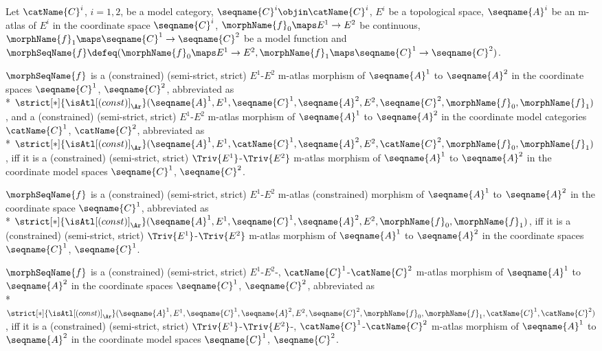 \documentclass{article}
\begin{document}
\begin{definition}
Let $\catName{C}^i$, $i=1,2$, be a model category,
$\seqname{C}^i \objin \catName{C}^i$, $E^i$ be a topological space,
$\seqname{A}^i$ be an m-atlas of $E^i$ in the coordinate space
$\seqname{C}^i$, $\morphName{f}_0 \maps E^1 \to E^2$ be continuous,
$\morphName{f}_1 \maps \seqname{C}^1 \to \seqname{C}^2$ be a model
function and
$
  \morphSeqName{f} \defeq
  (
    \morphName{f}_0 \maps E^1 \to E^2,
    \morphName{f}_1 \maps \seqname{C}^1 \to \seqname{C}^2
  )
$.

$\morphSeqName{f}$ is a (constrained) (semi-strict, strict) $E^1$-$E^2$
m-atlas morphism of $\seqname{A}^1$ to $\seqname{A}^2$ in the
coordinate spaces $\seqname{C}^1$, $\seqname{C}^2$, abbreviated as \\*
$
  \strict[*]{\isAtl[(const)]_\Ar}
    (
      \seqname{A}^1,
      E^1,
      \seqname{C}^1,
      \seqname{A}^2,
      E^2,
      \seqname{C}^2,
      \morphName{f}_0,
      \morphName{f}_1
    )
$,
and a (constrained) (semi-strict, strict) $E^1$-$E^2$ m-atlas
morphism of $\seqname{A}^1$ to $\seqname{A}^2$ in the coordinate model
categories $\catName{C}^1$, $\catName{C}^2$, abbreviated as \\*
$
  \strict[*]{\isAtl[(const)]_\Ar}
    (
      \seqname{A}^1,
      E^1,
      \catName{C}^1,
      \seqname{A}^2,
      E^2,
      \catName{C}^2,
      \morphName{f}_0,
      \morphName{f}_1
    )
$,
iff it is a (constrained) (semi-strict, strict)
$\Triv{E^1}$-$\Triv{E^2}$ m-atlas morphism of $\seqname{A}^1$ to
$\seqname{A}^2$ in the coordinate model spaces $\seqname{C}^1$,
$\seqname{C}^2$.

$\morphSeqName{f}$ is a (constrained) (semi-strict, strict) $E^1$-$E^2$
m-atlas (constrained) morphism of $\seqname{A}^1$ to
$\seqname{A}^2$ in the coordinate space $\seqname{C}^1$, abbreviated as
\\*
$
  \strict[*]{\isAtl[(const)]_\Ar}
  (
    \seqname{A}^1,
    E^1,
    \seqname{C}^1,
    \seqname{A}^2,
    E^2,
    \morphName{f}_0,
    \morphName{f}_1
  )
$,
iff it is a (constrained) (semi-strict, strict) $\Triv{E^1}$-$\Triv{E^2}$
m-atlas morphism of $\seqname{A}^1$ to $\seqname{A}^2$ in the coordinate
spaces $\seqname{C}^1$, $\seqname{C}^1$.

$\morphSeqName{f}$ is a (constrained) (semi-strict, strict)
\nobreaks
  {
    {$E^1$-$E^2$-},
    {$\catName{C}^1$-$\catName{C}^2$}
  }
m-atlas morphism of $\seqname{A}^1$ to $\seqname{A}^2$ in the
coordinate spaces $\seqname{C}^1$, $\seqname{C}^2$, abbreviated as \\*
$
  \strict[*]{\isAtl[(const)]_\Ar}
  (
    \seqname{A}^1,
    E^1,
    \seqname{C}^1,
    \seqname{A}^2,
    E^2,
    \seqname{C}^2,
    \morphName{f}_0,
    \morphName{f}_1,
    \catName{C}^1,
    \catName{C}^2
  )
$,
iff it is a (constrained) (semi-strict, strict)
\nobreaks
  {
    {$\Triv{E^1}$-$\Triv{E^2}$-},
    {$\catName{C}^1$-$\catName{C}^2$}
  }
m-atlas morphism of $\seqname{A}^1$ to $\seqname{A}^2$ in the
coordinate model spaces $\seqname{C}^1$, $\seqname{C}^2$.


\end{definition}
\end{document}
